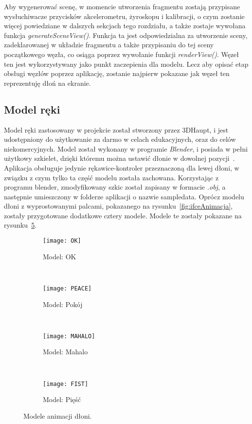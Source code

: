 Aby wygenerować scenę, w momencie utworzenia fragmentu zostają przypisane wysłuchiwacze przycisków akcelerometru, żyroskopu i kalibracji, o czym zostanie więcej powiedziane w dalszych sekcjach tego rozdziału, a także zostaje wywołana funkcja \textit{generateSceneView()}. Funkcja ta jest odpowiedzialna za utworzenie sceny, zadeklarowanej w układzie fragmentu a także przypisaniu do tej sceny początkowego węzła, co osiąga poprzez wywołanie funkcji \textit{renderView()}. Węzeł ten jest wykorzystywany jako punkt zaczepienia dla modelu. Lecz aby opisać etap obsługi węzłów poprzez aplikację, zostanie najpierw pokazane jak węzeł ten reprezentuję dłoń na ekranie.
	\subsection{Model ręki}
	\label{subsec:model}
	Model ręki zastosowany w projekcie został stworzony przez 3DHaupt, i jest udostępniony do użytkowanie za darmo w celach edukacyjnych, oraz do celów niekomercyjnych. Model został wykonany w programie \textit{Blender}, i posiada w pełni użytkowy szkielet, dzięki któremu można ustawić dłonie w dowolnej pozycji~\cite{hands}. Aplikacja obsługuje jedynie rękawice-kontroler przeznaczoną dla lewej dłoni, w związku z czym tylko ta część modelu została zachowana. Korzystając z programu blender, zmodyfikowany szkic został zapisany w formacie \textit{.obj}, a następnie umieszczony w folderze aplikacji o nazwie sampledata. Oprócz modelu dłoni z wyprostowanymi palcami, pokazanego na rysunku~\ref{fig:ifceAnimacja}, zostały przygotowane dodatkowe cztery modele. Modele te zostały pokazane na rysunku~\ref{fig:modele}.
\begin{figure}[h]
\centering
	\begin{subfigure}[b]{0.22\textwidth}
	\texttt{[image: OK]}
	\caption{Model: OK}
	\label{fig:modelOk}
	\end{subfigure}
	~
	\begin{subfigure}[b]{0.22\textwidth}
	\texttt{[image: PEACE]}
	\caption{Model: Pokój}
	\label{fig:modelPeace}
	\end{subfigure}
	~
	\begin{subfigure}[b]{0.22\textwidth}
	\texttt{[image: MAHALO]}
	\caption{Model: Mahalo}
	\label{fig:modelMahalo}
	\end{subfigure}
	~
	\begin{subfigure}[b]{0.22\textwidth}
	\texttt{[image: FIST]}
	\caption{Model: Pięść}
	\label{fig:modelFist}
	\end{subfigure}
\caption{Modele animacji dłoni.}
\label{fig:modele}
\end{figure}
